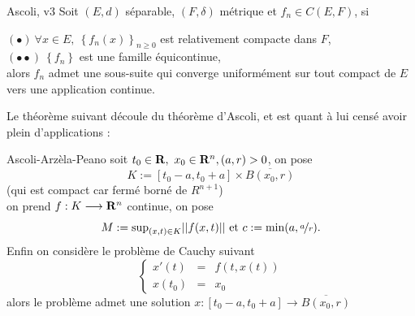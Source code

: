 \documentclass[a4paper,11pt, twoside]{article}
\begin{document}
\begin{thC}{Ascoli, v3}
  Soit $(E,d)$ séparable, $(F,\delta)$ métrique et $f_n\in C(E,F)$, si

  $(\bullet)\ \forall x\in E,\ \left\{f_n(x)\right\}_{n\geqslant 0}$ est relativement compacte dans $F$,\\
  $(\bullet\bullet)\ \left\{f_n\right\}$ est une famille équicontinue,\\

  alors $f_n$ admet une sous-suite qui converge uniformément sur tout compact de $E$ vers une application continue.
\end{thC}


Le théorème suivant découle du théorème d'Ascoli, et est quant à lui censé avoir plein d'applications :

\begin{thC}{Ascoli-Arzèla-Peano}
  soit $t_0\in\mathbf R,\ x_0\in\mathbf R^n, (a,r)>0$, on pose 
  $$K:=[t_0-a,t_0+a]\times \overline{B(x_0,r)}$$
  (qui est compact car fermé borné de $R^{n+1}$)\\
  on prend $f:K\longrightarrow \mathbf R^n$ continue, on pose
  $$M:=\mathrm{sup}_{(x,t)\in K}||f(x,t)||\text{ et }c:=\mathrm{min}(a,\nicefrac{a}{r}).$$
  Enfin on considère le problème de Cauchy suivant 
  $$\left\{\begin{array}{rcl}
    x'(t)&=&f(t,x(t))\\
    x(t_0)&=&x_0
  \end{array}\right.$$
  alors le problème admet une solution $x:[t_0-a,t_0+a]\longrightarrow \overline{B(x_0,r)}$
\end{thC}
\end{document}
